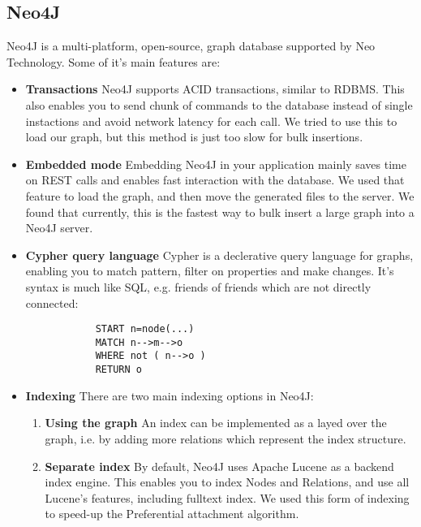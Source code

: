\subsection{Neo4J}
Neo4J is a multi-platform, open-source, graph database supported by Neo
Technology. Some of it's main features are:
\begin{itemize}
    \item {\bf Transactions}
        Neo4J supports ACID transactions, similar to RDBMS. This also enables 
        you to send chunk of commands to the database instead of single 
        instactions and avoid network latency for each call. We tried to use
        this to load our graph, but this method is just too slow for bulk insertions.
    \item {\bf Embedded mode}
        Embedding Neo4J in your application mainly saves time on REST calls 
        and enables fast interaction with the database. We used that feature 
        to load the graph, and then move the generated files to the server.
        We found that currently, this is the fastest way to bulk insert a 
        large graph into a Neo4J server.
    \item {\bf Cypher query language}
        Cypher is a declerative query language for graphs, enabling you to
        match pattern, filter on properties and make changes. It's syntax is
        much like SQL, e.g. friends of friends which are not directly connected:
        \begin{verbatim}
            START n=node(...)
            MATCH n-->m-->o
            WHERE not ( n-->o )
            RETURN o
        \end{verbatim}
    \item {\bf Indexing}
		There are two main indexing options in Neo4J:
		\begin{enumerate}
			\item {\bf Using the graph}
				An index can be implemented as a layed over the graph, 
				i.e. by adding more relations which represent the index
				structure.
			\item {\bf Separate index}
				By default, Neo4J uses Apache Lucene as a backend index engine.
				This enables you to index Nodes and Relations, and use all Lucene's
				features, including fulltext index.
				We used this form of indexing to speed-up the Preferential attachment
				algorithm.
		\end{enumerate}
\end{itemize}

